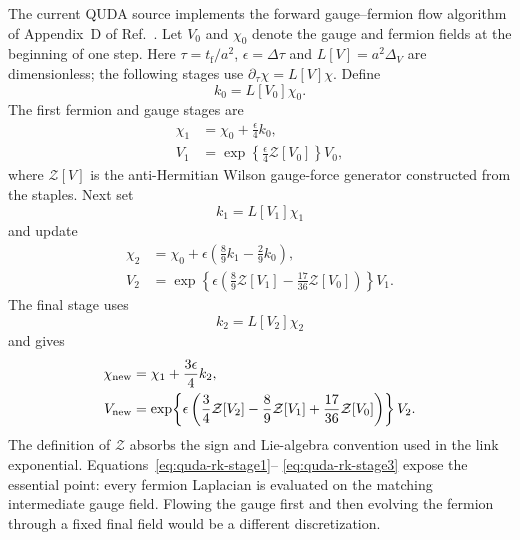 \documentclass[11pt]{article}
\numberwithin{equation}{section}
\newcommand{\tf}{t_{\mathrm f}}
\begin{document}
The current QUDA source implements the forward gauge--fermion flow algorithm
of Appendix~D of Ref.~\cite{Luscher2013}.  Let \(V_0\) and \(\chi_0\) denote
the gauge and fermion fields at the beginning of one step. Here
\(\tau=\tf/a^2\), \(\epsilon=\Delta\tau\) and
\(L[V]=a^2\Delta_V\) are dimensionless; the following stages use
\(\partial_\tau\chi=L[V]\chi\). Define
\begin{equation}
  k_0=L[V_0]\chi_0.
\end{equation}
The first fermion and gauge stages are
\begin{align}
  \chi_1
  &=\chi_0+\frac{\epsilon}{4}k_0,
  \\
  V_1
  &=\exp\!\left\{
      \frac{\epsilon}{4}\mathcal Z[V_0]
    \right\}V_0,
  \label{eq:quda-rk-stage1}
\end{align}
where \(\mathcal Z[V]\) is the anti-Hermitian Wilson gauge-force generator
constructed from the staples.  Next set
\begin{equation}
  k_1=L[V_1]\chi_1
\end{equation}
and update
\begin{align}
  \chi_2
  &=\chi_0+\epsilon\left(
      \frac{8}{9}k_1-\frac{2}{9}k_0
    \right),
  \\
  V_2
  &=\exp\!\left\{
      \epsilon\left(
        \frac{8}{9}\mathcal Z[V_1]
        -\frac{17}{36}\mathcal Z[V_0]
      \right)
    \right\}V_1.
  \label{eq:quda-rk-stage2}
\end{align}
The final stage uses
\begin{equation}
  k_2=L[V_2]\chi_2
\end{equation}
and gives
\begin{align}
  \chi_{\rm new}
  &=\chi_1+\frac{3\epsilon}{4}k_2,
  \\
  V_{\rm new}
  &=\exp\!\left\{
      \epsilon\left(
        \frac{3}{4}\mathcal Z[V_2]
        -\frac{8}{9}\mathcal Z[V_1]
        +\frac{17}{36}\mathcal Z[V_0]
      \right)
    \right\}V_2.
  \label{eq:quda-rk-stage3}
\end{align}
The definition of \(\mathcal Z\) absorbs the sign and Lie-algebra convention
used in the link exponential.  Equations~\eqref{eq:quda-rk-stage1}--
\eqref{eq:quda-rk-stage3} expose the essential point: every fermion Laplacian
is evaluated on the matching intermediate gauge field.  Flowing the gauge
first and then evolving the fermion through a fixed final field would be a
different discretization.
\end{document}
